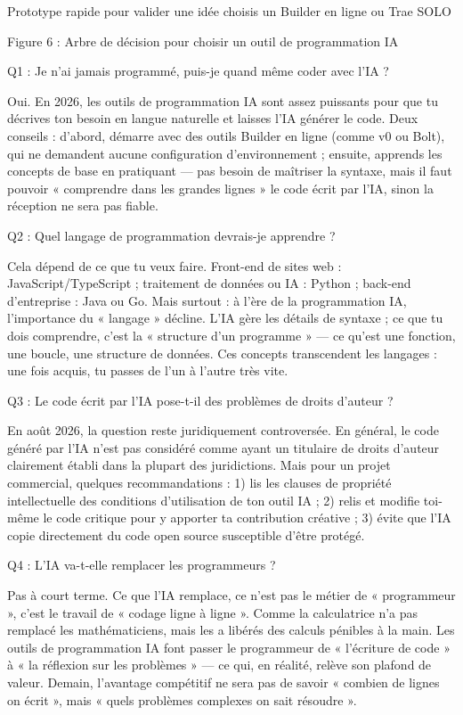 Prototype rapide pour valider une idée choisis un Builder en ligne ou Trae SOLO

\begin{center}\small\color{gray}Figure 6 : Arbre de décision pour choisir un outil de programmation IA\end{center}


Q1 : Je n'ai jamais programmé, puis-je quand même coder avec l'IA ?

Oui. En 2026, les outils de programmation IA sont assez puissants pour que tu décrives ton besoin en langue naturelle et laisses l'IA générer le code. Deux conseils : d'abord, démarre avec des outils Builder en ligne (comme v0 ou Bolt), qui ne demandent aucune configuration d'environnement ; ensuite, apprends les concepts de base en pratiquant — pas besoin de maîtriser la syntaxe, mais il faut pouvoir « comprendre dans les grandes lignes » le code écrit par l'IA, sinon la réception ne sera pas fiable.

Q2 : Quel langage de programmation devrais-je apprendre ?

Cela dépend de ce que tu veux faire. Front-end de sites web : JavaScript/TypeScript ; traitement de données ou IA : Python ; back-end d'entreprise : Java ou Go. Mais surtout : à l'ère de la programmation IA, l'importance du « langage » décline. L'IA gère les détails de syntaxe ; ce que tu dois comprendre, c'est la « structure d'un programme » — ce qu'est une fonction, une boucle, une structure de données. Ces concepts transcendent les langages : une fois acquis, tu passes de l'un à l'autre très vite.

Q3 : Le code écrit par l'IA pose-t-il des problèmes de droits d'auteur ?

En août 2026, la question reste juridiquement controversée. En général, le code généré par l'IA n'est pas considéré comme ayant un titulaire de droits d'auteur clairement établi dans la plupart des juridictions. Mais pour un projet commercial, quelques recommandations : 1) lis les clauses de propriété intellectuelle des conditions d'utilisation de ton outil IA ; 2) relis et modifie toi-même le code critique pour y apporter ta contribution créative ; 3) évite que l'IA copie directement du code open source susceptible d'être protégé.

Q4 : L'IA va-t-elle remplacer les programmeurs ?

Pas à court terme. Ce que l'IA remplace, ce n'est pas le métier de « programmeur », c'est le travail de « codage ligne à ligne ». Comme la calculatrice n'a pas remplacé les mathématiciens, mais les a libérés des calculs pénibles à la main. Les outils de programmation IA font passer le programmeur de « l'écriture de code » à « la réflexion sur les problèmes » — ce qui, en réalité, relève son plafond de valeur. Demain, l'avantage compétitif ne sera pas de savoir « combien de lignes on écrit », mais « quels problèmes complexes on sait résoudre ».

